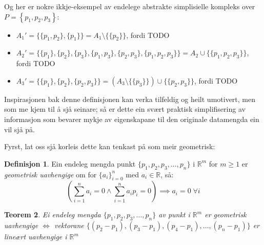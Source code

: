 \documentclass[a4paper, 12pt, norsk]{article}
\theoremstyle{plain}
\newtheorem{theorem}{Teorem}[section]
\theoremstyle{definition}
\newtheorem{definition}[theorem]{Definisjon}
\newcommand{\Rb}{\mathbb{R}}
\newcommand{\union}{ \mathop{\cup}\limits }
\newcommand{\set}[1]{ \left \{ #1 \right \} } %
\begin{document}
Og her er nokre ikkje-eksempel av endelege abstrakte simplisielle kompleks over \( P=\set{p_1, p_2, p_3} \):

\begin{itemize}
	\item{$A_1'=\{\{p_1, p_2\}, \{p_1\}\}=A_1 \setminus \{\{p_2\}\}$, fordi TODO}
	\item{$A_2'=\{\{p_1\}, \{p_2\}, \{p_3\}, \{p_1, p_3\}, \{p_2, p_3\}, \{p_1, p_2, p_3\}\}=A_2 \union \{\{p_1, p_2, p_3\}\}$, fordi TODO}
	\item{$A_3'=\{\{p_1\}, \{p_2\}, \{p_2, p_3\}\}=\left(A_3 \setminus \{\{p_3\}\}\right) \union \{\{p_2, p_3\}\}$, fordi TODO}
\end{itemize}

Inspirasjonen bak denne definisjonen kan verka tilfeldig og heilt umotivert, men som me kjem til å sjå seinare; så er dette ein svært praktisk simplifisering av informasjon som bevarer mykje av eigenskapane til den originale datamengda ein vil sjå på.

Fyrst, lat oss sjå korleis dette kan tenkast på som meir geometrisk:

\begin{definition}
	Ein endeleg mengda punkt $\{p_1, p_2, p_3, \dots, p_n\}$ i $\Rb^m$ for $m\geq1$ er \emph{geometrisk uavhengige} om for $\{a_i\}_{i=0}^n$ med $a_i\in\Rb$, så:
	\begin{equation*}
		\left(\sum_{i=1}^n a_i=0 \land  \sum_{i=1}^n a_ip_i=0\right)\implies a_i=0 \; \forall i
	\end{equation*}
\end{definition}

\begin{theorem}\label{thm:geometrisklineærtuavhengig}
	Ei endeleg mengda $\{p_1, p_2, p_3, \dots, p_n \}$ av punkt i $\Rb^m$ er geometrisk uavhengige $\Longleftrightarrow$ vektorane $\{(p_2-p_1), (p_3-p_1), (p_4-p_1),\dots,(p_n-p_1)\}$ er lineært uavhengige i $\Rb^m$
\end{theorem}
\end{document}
